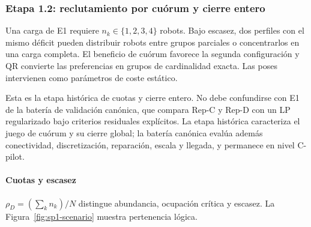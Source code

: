 \subsubsection{Etapa 1.2: reclutamiento por cuórum y cierre entero}
\label{subsubsec:sp1-quorum}
\begingroup
\setlength{\parskip}{3pt plus 0.5pt}

Una carga de E1 requiere \(n_k\in\{1,2,3,4\}\) robots. Bajo escasez, dos perfiles con el mismo déficit pueden distribuir robots entre grupos parciales o concentrarlos en una carga completa. El beneficio de cuórum favorece la segunda configuración y QR convierte las preferencias en grupos de cardinalidad exacta. Las poses intervienen como parámetros de coste estático.

Esta es la etapa histórica de cuotas y cierre entero. No debe confundirse con
E1 de la batería de validación canónica, que compara Rep-C y Rep-D con un LP
regularizado bajo criterios residuales explícitos. La etapa histórica
caracteriza el juego de cuórum y su cierre global; la batería canónica evalúa
además conectividad, discretización, reparación, escala y llegada, y permanece
en nivel C-pilot.

\paragraph{Cuotas y escasez}

$\rho_D=(\sum_k n_k)/N$ distingue abundancia, ocupación crítica y escasez. La Figura~\ref{fig:sp1-scenario} muestra pertenencia lógica.

